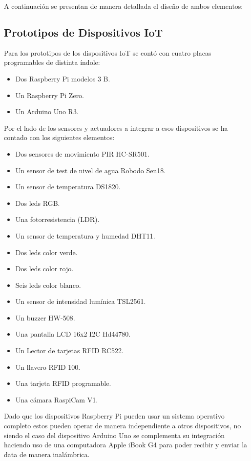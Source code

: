 A continuación se presentan de manera detallada el diseño de ambos elementos:

\subsection{Prototipos de Dispositivos IoT}
Para los prototipos de los dispositivos IoT se contó con cuatro placas programables de distinta índole:
\begin{itemize}
\item Dos Raspberry Pi modelos 3 B.
\item Un Raspberry Pi Zero.
\item Un Arduino Uno R3.
\end{itemize}

Por el lado de los sensores y actuadores a integrar a esos dispositivos se ha contado con los siguientes elementos:
\begin{itemize}
\item Dos sensores de movimiento PIR HC-SR501.
\item Un sensor de test de nivel de agua Robodo Sen18.
\item Un sensor de temperatura DS1820.
\item Dos leds RGB.
\item Una fotorresistencia (LDR).
\item Un sensor de temperatura y humedad DHT11.
\item Dos leds color verde.
\item Dos leds color rojo.
\item Seis leds color blanco.
\item Un sensor de intensidad lumínica TSL2561.
\item Un buzzer HW-508.
\item Una pantalla LCD 16x2 I2C Hd44780.
\item Un Lector de tarjetas RFID RC522.
\item Un llavero RFID 100.
\item Una tarjeta RFID programable. 
\item Una cámara RaspiCam V1.  
\end{itemize}

Dado que los dispositivos Raspberry Pi pueden usar un sistema operativo completo estos pueden operar de manera independiente a otros dispositivos, no siendo el caso del dispositivo Arduino Uno se complementa su integración haciendo uso de una computadora Apple iBook G4 para poder recibir y enviar la data de manera inalámbrica.\\

